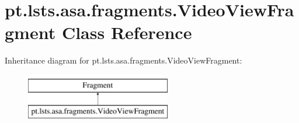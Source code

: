 \hypertarget{classpt_1_1lsts_1_1asa_1_1fragments_1_1VideoViewFragment}{}\section{pt.\+lsts.\+asa.\+fragments.\+Video\+View\+Fragment Class Reference}
\label{classpt_1_1lsts_1_1asa_1_1fragments_1_1VideoViewFragment}
Inheritance diagram for pt.\+lsts.\+asa.\+fragments.\+Video\+View\+Fragment\+:\begin{figure}[H]
\begin{center}
\leavevmode
\includegraphics[height=2.000000cm]{classpt_1_1lsts_1_1asa_1_1fragments_1_1VideoViewFragment}
\end{center}
\end{figure}
